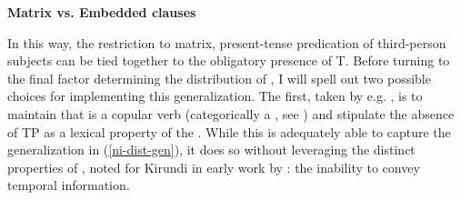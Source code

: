 \documentclass[12pt]{article}
\begin{document}
\bex
\ex \textbf{Matrix vs. Embedded clauses} \label{matrix}
\bxl
\fxl
\fex

In this way, the restriction to matrix, present-tense predication of third-person subjects can be tied together to the obligatory presence of T. Before turning to the final factor determining the distribution of , I will spell out two possible choices for implementing this generalization. The first, taken by e.g. \citet{zentz-2016}, is to maintain that  is a copular verb (categorically a , see \citealt{mikkelsen-2005,mikkelsen-2011}) and stipulate the absence of TP as a lexical property of the . While this is adequately able to capture the generalization in (\ref{ni-dist-gen}), it does so without leveraging the distinct properties of , noted for Kirundi in early work by \citet[p. 180-6]{meeussen-1959}: the inability to convey temporal information.
\end{document}
